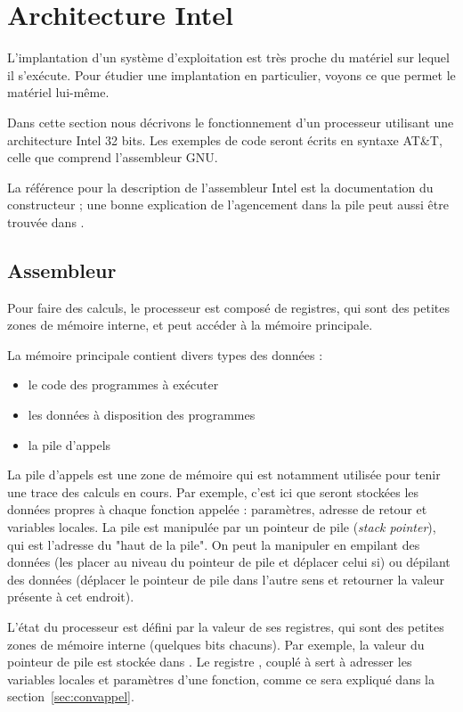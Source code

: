 \section{Architecture Intel}

L'implantation d'un système d'exploitation est très proche du matériel sur
lequel il s'exécute. Pour étudier une implantation en particulier, voyons ce que
permet le matériel lui-même.

Dans cette section nous décrivons le fonctionnement d'un processeur utilisant
une architecture Intel 32 bits. Les exemples de code seront écrits en syntaxe
AT\&T, celle que comprend l'assembleur GNU.

La référence pour la description de l'assembleur Intel est la documentation du
constructeur \cite{intelsys} ; une bonne explication de l'agencement dans la
pile peut aussi être trouvée dans \cite{SmashingTheStack}.

\subsection{Assembleur}

Pour faire des calculs, le processeur est composé de registres, qui sont des
petites zones de mémoire interne, et peut accéder à la mémoire principale.

La mémoire principale contient divers types des données :

\begin{itemize}
\item le code des programmes à exécuter
\item les données à disposition des programmes
\item la pile d'appels
\end{itemize}

La pile d'appels est une zone de mémoire qui est notamment utilisée pour tenir
une trace des calculs en cours. Par exemple, c'est ici que seront stockées les
données propres à chaque fonction appelée : paramètres, adresse de retour et
variables locales. La pile est manipulée par un pointeur de pile (\emph{stack
pointer}), qui est l'adresse du "haut de la pile". On peut la manipuler en
empilant des données (les placer au niveau du pointeur de pile et déplacer celui
si) ou dépilant des données (déplacer le pointeur de pile dans l'autre sens et
retourner la valeur présente à cet endroit).

L'état du processeur est défini par la valeur de ses registres, qui sont des
petites zones de mémoire interne (quelques bits chacuns). Par exemple, la valeur
du pointeur de pile est stockée dans \esp. Le registre \ebp, couplé à \esp sert
à adresser les variables locales et paramètres d'une fonction, comme ce sera
expliqué dans la section~\ref{sec:convappel}.

